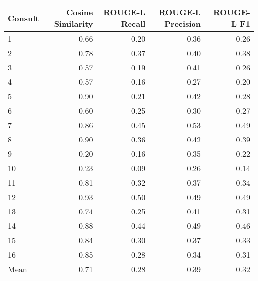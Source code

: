 \begin{tabular}{lrrrr}
\toprule
Consult & Cosine Similarity & ROUGE-L Recall & ROUGE-L Precision & ROUGE-L F1 \\
\midrule
1 & 0.66 & 0.20 & 0.36 & 0.26 \\
2 & 0.78 & 0.37 & 0.40 & 0.38 \\
3 & 0.57 & 0.19 & 0.41 & 0.26 \\
4 & 0.57 & 0.16 & 0.27 & 0.20 \\
5 & 0.90 & 0.21 & 0.42 & 0.28 \\
6 & 0.60 & 0.25 & 0.30 & 0.27 \\
7 & 0.86 & 0.45 & 0.53 & 0.49 \\
8 & 0.90 & 0.36 & 0.42 & 0.39 \\
9 & 0.20 & 0.16 & 0.35 & 0.22 \\
10 & 0.23 & 0.09 & 0.26 & 0.14 \\
11 & 0.81 & 0.32 & 0.37 & 0.34 \\
12 & 0.93 & 0.50 & 0.49 & 0.49 \\
13 & 0.74 & 0.25 & 0.41 & 0.31 \\
14 & 0.88 & 0.44 & 0.49 & 0.46 \\
15 & 0.84 & 0.30 & 0.37 & 0.33 \\
16 & 0.85 & 0.28 & 0.34 & 0.31 \\
Mean & 0.71 & 0.28 & 0.39 & 0.32 \\
\bottomrule
\end{tabular}
